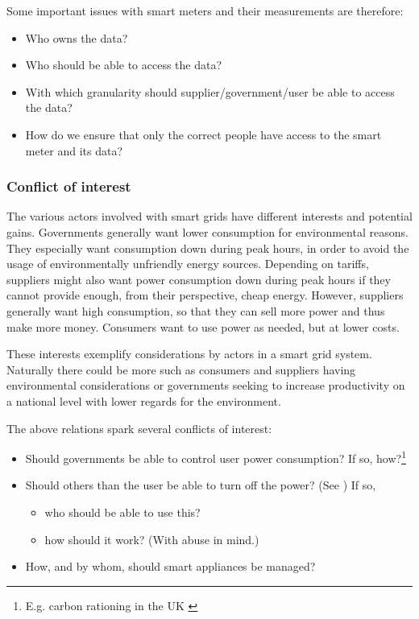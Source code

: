 Some important issues with smart meters and their measurements are therefore:
\begin{itemize}
	\item Who owns the data?
	\item Who should be able to access the data?
	\item With which granularity should supplier/government/user be able to access the data?
	\item How do we ensure that only the correct people have access to the smart meter and its data?
\end{itemize}

\subsubsection{Conflict of interest}
The various actors involved with smart grids have different interests and potential gains.
Governments generally want lower consumption for environmental reasons.
They especially want consumption down during peak hours, in order to avoid the usage of environmentally unfriendly energy sources.
Depending on tariffs, suppliers might also want power consumption down during peak hours if they cannot provide enough, from their perspective, cheap energy.
However, suppliers generally want high consumption, so that they can sell more power and thus make more money.
Consumers want to use power as needed, but at lower costs.

These interests exemplify considerations by actors in a smart grid system.
Naturally there could be more such as consumers and suppliers having environmental considerations or governments seeking to increase productivity on a national level with lower regards for the environment.

The above relations spark several conflicts of interest:
\begin{itemize}
	\item Should governments be able to control user power consumption? If so, how?\footnote{E.g. carbon rationing in the UK \cite{security_economics}}
	\item Should others than the user be able to turn off the power? (See \cite{offswitch}) If so,
	\begin{itemize}
		\item who should be able to use this?
		\item how should it work? (With abuse in mind.)
	\end{itemize}
	\item How, and by whom, should smart appliances be managed?
\end{itemize}

